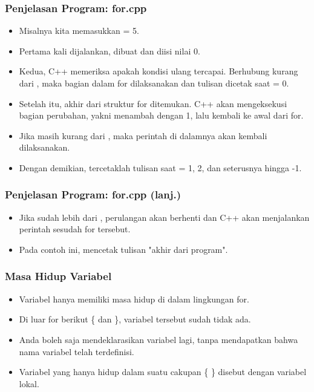 \begin{frame}
\frametitle{Penjelasan Program: for.cpp}
\begin{itemize}
  \item Misalnya kita memasukkan  = 5.
  \item Pertama kali dijalankan,  dibuat dan diisi nilai 0.
  \item Kedua, C++ memeriksa apakah kondisi ulang tercapai. Berhubung  kurang dari , maka bagian dalam for dilaksanakan dan tulisan dicetak saat  = 0.
  \item Setelah itu, akhir dari struktur for ditemukan. C++ akan mengeksekusi bagian perubahan, yakni menambah  dengan 1, lalu kembali ke awal dari for.
  \item Jika  masih kurang dari , maka perintah di dalamnya akan kembali dilaksanakan.
  \item Dengan demikian, tercetaklah tulisan saat  = 1, 2, dan seterusnya hingga -1.
\end{itemize}
\end{frame}

\begin{frame}
\frametitle{Penjelasan Program: for.cpp (lanj.)}
\begin{itemize}
  \item Jika  sudah lebih dari , perulangan akan berhenti dan C++ akan menjalankan perintah sesudah for tersebut.
  \item Pada contoh ini, mencetak tulisan "akhir dari program".
\end{itemize}
\end{frame}

\begin{frame}
\frametitle{Masa Hidup Variabel}
\begin{itemize}
  \item Variabel  hanya memiliki masa hidup di dalam lingkungan for.
  \item Di luar for berikut \{ dan \}, variabel tersebut sudah tidak ada.
  \item Anda boleh saja mendeklarasikan variabel  lagi, tanpa mendapatkan  bahwa nama variabel telah terdefinisi.
  \item Variabel yang hanya hidup dalam suatu cakupan \{ \} disebut dengan variabel lokal.
\end{itemize}
\end{frame}


